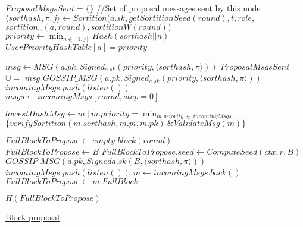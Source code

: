 \documentclass[10pt,a4paper]{article}
\begin{document}
\begin{algorithm}
    \begin{algorithmic}[H]
        \State $ProposalMsgsSent = \{\}$ //Set of proposal messages sent by this node\\

            \State $\langle sorthash, \pi, j \rangle \gets Sortition(a.sk, getSortitionSeed(round), t, role, $ \newline
            $sortition_w(a, round), sortitionW(round))$
                \State $priority \gets \min_{n \in [1,j]}{Hash(sorthash || n)}$
                \State $UserPriorityHashTable[a] = priority$

                \State $msg \gets MSG(a.pk, Signed_{a.sk}(priority, \langle sorthash, \pi \rangle))$
                \State $ProposalMsgsSent$ $\cup=$ $msg$
                \State $GOSSIP\_MSG(a.pk, Signed_{a.sk}(priority, \langle sorthash, \pi \rangle))$
            \EndIf
        \EndFor\\

            \State $incomingMsgs.push(listen())$
        \EndWhile\\

        \State $msgs \gets incomingMsgs[round, step=0]$


        \State $lowestHashMsg \gets m\ |\ m.priority = \min_{m.priority\ \in\ incomingMsgs}$ \newline
        ${\{verifySortition(m.sorthash, m.pi, m.pk)\ \& ValidateMsg(m)\}}$

        \State $FullBlockToPropose \gets empty\_block(round)$\\

            \State $FullBlockToPropose \gets B$
            \State $FullBlockToPropose.seed \gets ComputeSeed(ctx, r, B)$
            \State $GOSSIP\_MSG(a.pk, Signed{a.sk}(B, \langle sorthash, \pi \rangle))$
        \Else
        {
                \State $incomingMsgs.push(listen())$
                \State $m \gets incomingMsgs.back()$
                    \State $FullBlockToPropose \gets m.FullBlock$
                \EndIf
            \EndWhile
        }
        \EndIf

        \Return $H(FullBlockToPropose)$

    \EndFunction
    \end{algorithmic}
    \caption{\underline{Block proposal}}
\end{algorithm}
\end{document}

